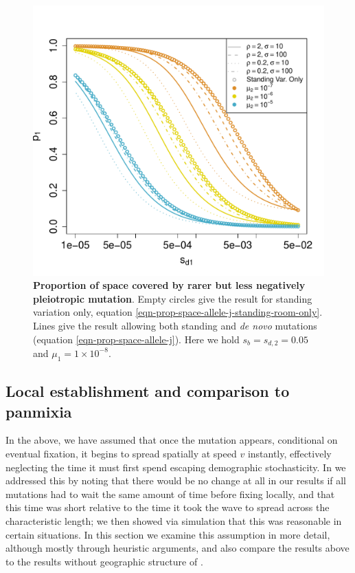 \documentclass{article}
\begin{document}

\begin{figure}[ht]
\begin{center}
  \includegraphics[width=1.0\textwidth]{pleiotropy_calc}
\caption{ %
{\bf Proportion of space covered by rarer but less negatively pleiotropic
  mutation}. Empty circles give the result for standing variation only,
  equation \eqref{eqn-prop-space-allele-j-standing-room-only}. Lines give
  the result allowing both standing and \textit{de novo} mutations (equation \eqref{eqn-prop-space-allele-j}).
  Here we hold $s_b=s_{d,2}=0.05$ and $\mu_1=1 \times 10^{-8}$.
  }   \label{fig:pleiotropy_calc}
\end{center}
\end{figure}


\subsection{Local establishment and comparison to panmixia}

In the above, we have assumed that once the mutation appears,
conditional on eventual fixation, it begins to spread spatially at speed $v$ instantly,
effectively neglecting the time it must first spend escaping demographic stochasticity.
In \citet{ralphcoop2010} we addressed this by noting that there would be no change at all in our results 
if all mutations had to wait the same amount of time before fixing locally,
and that this time was short relative to the time it took the wave to spread across the characteristic length;
we then showed via simulation that this was reasonable in certain situations.
In this section we examine this assumption in more detail, although mostly through heuristic arguments,
and also compare the results above to the results without geographic structure of \citet{softsweepsII}.
\end{document}
